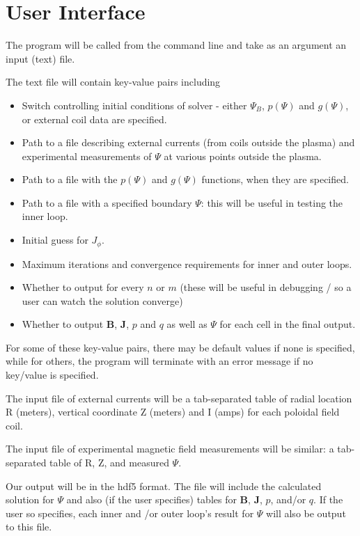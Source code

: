 \documentclass[paper=letter, fontsize=11pt]{scrartcl} %
\begin{document}

\section{User Interface}

The program will be called from the command line and take as an argument an input (text) file. 

The text file will contain key-value pairs including
\begin{itemize}
\item Switch controlling initial conditions of solver - either $\Psi_B$, $p(\Psi)$ and $g(\Psi)$, or external coil data are specified. 
\item Path to a file describing external currents (from coils outside the plasma) and experimental measurements of $\Psi$ at various points outside the plasma.
\item Path to a file with the $p(\Psi)$ and $g(\Psi)$ functions, when they are specified.
\item Path to a file with a specified boundary $\Psi$: this will be useful in testing the inner loop.
\item Initial guess for $J_\phi$. 
\item Maximum iterations and convergence requirements for inner and outer loops. 
\item Whether to output for every $n$ or $m$ (these will be useful in debugging / so a user can watch the solution converge)
\item Whether to output $\mathbf{B}$, $\mathbf{J}$, $p$ and $q$ as well as $\Psi$ for each cell in the final output.
\end{itemize}

For some of these key-value pairs, there may be default values if none is specified, while for others, the program will terminate with an error message if no key/value is specified.

The input file of external currents will be a tab-separated table of radial location R (meters), vertical coordinate Z (meters) and I (amps) for each poloidal field coil.

The input file of experimental magnetic field measurements will be similar: a tab-separated table of R, Z, and measured $\Psi$.

Our output will be in the hdf5 format. The file will include the calculated solution for $\Psi$ and also (if the user specifies) tables for $\mathbf{B}$, $\mathbf{J}$, $p$, and/or $q$. If the user so specifies, each inner and /or outer loop's result for $\Psi$ will also be output to this file.
\end{document}
